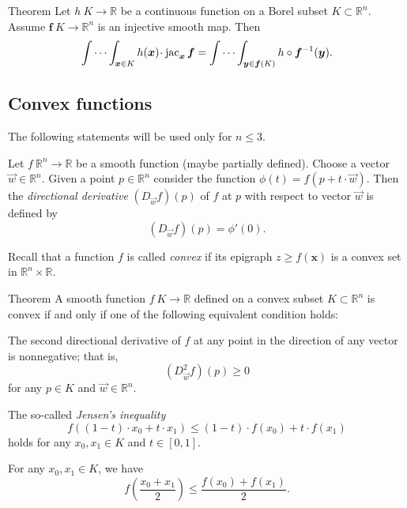 \begin{thm}{Theorem}\label{thm:mult-substitution} 
Let $h\:K\to\mathbb{R}$ be a continuous function on a Borel subset $K\subset \mathbb{R}^n$.
Assume $\bm{f}\:K\to \mathbb{R}^n$ is an injective smooth map.
Then 
\[\idotsint_{\bm{x}\in K} h(\bm{x})\cdot \jac_{\bm{x}}\bm{f}
=
\idotsint_{\bm{y}\in \bm{f}(K)} h\circ \bm{f}^{-1}(\bm{y}).\]

\end{thm}

\subsection*{Convex functions}

The following statements will be used only for $n\le 3$.

Let $f\:\mathbb{R}^n\to \mathbb{R}$ be a smooth function (maybe partially defined).
Choose a vector $\vec w\in \mathbb{R}^n$.
Given a point $p\in\mathbb{R}^n$ consider the function $\phi(t)=f(p+t\cdot \vec w)$.
Then the \emph{directional derivative} $(D_{\vec w}f)(p)$ of $f$ at $p$ with respect to vector $\vec w$ is defined by
\[(D_{\vec w}f)(p)=\phi'(0).\]

Recall that a function $f$ is called \emph{convex} if 
its epigraph $z\ge f(\bm{x})$ is a convex set in $\mathbb{R}^n\times \mathbb{R}$.

\begin{thm}{Theorem}
A smooth function $f\:K\to \mathbb{R}$ defined on a convex subset $K\subset\mathbb{R}^n$ is convex if and only if one of the following equivalent condition holds:

\begin{subthm}{}
The second directional derivative of $f$ at any point in the direction of any vector is nonnegative; that is,
\[(D_{\vec w}^2f)(p)\ge 0\]
for any $p\in K$ and $\vec w\in\mathbb{R}^n$.
\end{subthm}

\begin{subthm}{}
The so-called \emph{Jensen's inequality}
\[f \left ((1-t)\cdot x_0 + t\cdot x_1 \right ) \le (1-t)\cdot f(x_0)+ t\cdot f(x_1)\]
holds for any $x_0,x_1\in K$ and $t\in[0,1]$.

\end{subthm}

\begin{subthm}{}
For any $x_0,x_1\in K$, we have 
\[f \left (\frac{x_0 + x_1}2 \right ) \le \frac{f(x_0) + f(x_1)}2.\]
\end{subthm}

\end{thm}




